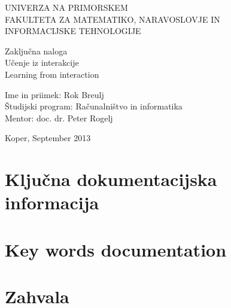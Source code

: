 \documentclass[a4paper, oneside, 12pt]{article}
\begin{document}
\begin{titlepage}
\begin{center}
\begin{large}
UNIVERZA NA PRIMORSKEM\\
FAKULTETA ZA MATEMATIKO, NARAVOSLOVJE IN\\
INFORMACIJSKE TEHNOLOGIJE\\[6cm]
\end{large}
\end{center}

\begin{center}
Zaključna naloga\\
{\large Učenje iz interakcije}\\
Learning from interaction\\[6cm]
\end{center}

\noindent
Ime in priimek: Rok Breulj\\
Študijski program: Računalništvo in informatika\\
Mentor: doc. dr. Peter Rogelj\\

\vfill
\begin{center}
{\large Koper, September 2013}
\end{center}
\end{titlepage}

\section*{Ključna dokumentacijska informacija}
\newpage

\section*{Key words documentation}
\newpage

\section*{Zahvala}
\newpage

\tableofcontents
\newpage

\listoftables
\newpage
\end{document}
